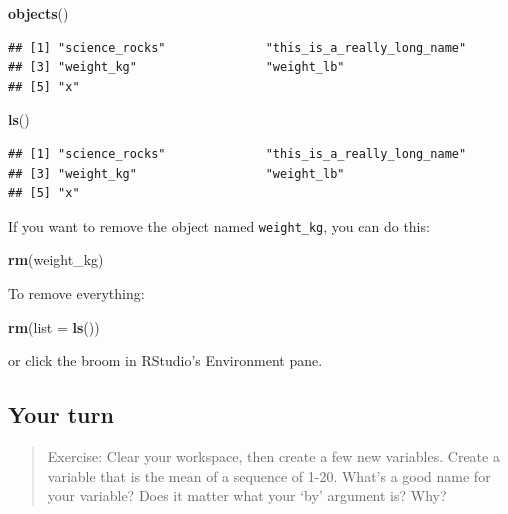 \documentclass[]{book}
\newenvironment{Shaded}{\begin{snugshade}}{\end{snugshade}}
\newcommand{\KeywordTok}[1]{\textcolor[rgb]{0.13,0.29,0.53}{\textbf{#1}}}
\newcommand{\DataTypeTok}[1]{\textcolor[rgb]{0.13,0.29,0.53}{#1}}
\newcommand{\NormalTok}[1]{#1}
\theoremstyle{definition}
\theoremstyle{definition}
\theoremstyle{definition}
\theoremstyle{remark}
\begin{document}
\begin{Shaded}
\begin{Highlighting}[]
\KeywordTok{objects}\NormalTok{()}
\end{Highlighting}
\end{Shaded}

\begin{verbatim}
## [1] "science_rocks"              "this_is_a_really_long_name"
## [3] "weight_kg"                  "weight_lb"                 
## [5] "x"
\end{verbatim}

\begin{Shaded}
\begin{Highlighting}[]
\KeywordTok{ls}\NormalTok{()}
\end{Highlighting}
\end{Shaded}

\begin{verbatim}
## [1] "science_rocks"              "this_is_a_really_long_name"
## [3] "weight_kg"                  "weight_lb"                 
## [5] "x"
\end{verbatim}

If you want to remove the object named \texttt{weight\_kg}, you can do
this:

\begin{Shaded}
\begin{Highlighting}[]
\KeywordTok{rm}\NormalTok{(weight_kg)}
\end{Highlighting}
\end{Shaded}

To remove everything:

\begin{Shaded}
\begin{Highlighting}[]
\KeywordTok{rm}\NormalTok{(}\DataTypeTok{list =} \KeywordTok{ls}\NormalTok{())}
\end{Highlighting}
\end{Shaded}

or click the broom in RStudio's Environment pane.

\subsection{Your turn}\label{your-turn-1}

\begin{quote}
Exercise: Clear your workspace, then create a few new variables. Create
a variable that is the mean of a sequence of 1-20. What's a good name
for your variable? Does it matter what your `by' argument is? Why?
\end{quote}
\end{document}
